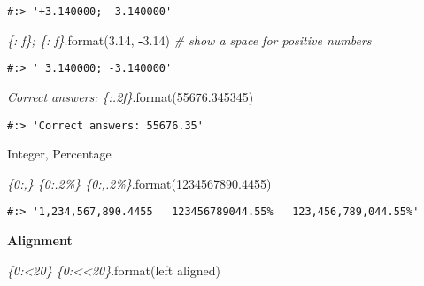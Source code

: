 \documentclass[
]{book}
\newenvironment{Shaded}{\begin{snugshade}}{\end{snugshade}}
\newcommand{\BuiltInTok}[1]{#1}
\newcommand{\CommentTok}[1]{\textcolor[rgb]{0.37,0.37,0.37}{\textit{#1}}}
\newcommand{\FloatTok}[1]{\textcolor[rgb]{0.06,0.06,0.06}{#1}}
\newcommand{\NormalTok}[1]{#1}
\newcommand{\OperatorTok}[1]{\textcolor[rgb]{0.43,0.43,0.43}{\textbf{#1}}}
\newcommand{\StringTok}[1]{\textcolor[rgb]{0.5,0.5,0.5}{#1}}
\begin{document}
\begin{verbatim}
#:> '+3.140000; -3.140000'
\end{verbatim}

\begin{Shaded}
\begin{Highlighting}[]
\CommentTok{\textquotesingle{}\{: f\}; \{: f\}\textquotesingle{}}\NormalTok{.}\BuiltInTok{format}\NormalTok{(}\FloatTok{3.14}\NormalTok{, }\OperatorTok{{-}}\FloatTok{3.14}\NormalTok{)  }\CommentTok{\# show a space for positive numbers}
\end{Highlighting}
\end{Shaded}

\begin{verbatim}
#:> ' 3.140000; -3.140000'
\end{verbatim}

\begin{Shaded}
\begin{Highlighting}[]
\CommentTok{\textquotesingle{}Correct answers: \{:.2f\}\textquotesingle{}}\NormalTok{.}\BuiltInTok{format}\NormalTok{(}\FloatTok{55676.345345}\NormalTok{)}
\end{Highlighting}
\end{Shaded}

\begin{verbatim}
#:> 'Correct answers: 55676.35'
\end{verbatim}

Integer, Percentage

\begin{Shaded}
\begin{Highlighting}[]
\CommentTok{\textquotesingle{}\{0:,\}   \{0:.2\%\}   \{0:,.2\%\}\textquotesingle{}}\NormalTok{.}\BuiltInTok{format}\NormalTok{(}\FloatTok{1234567890.4455}\NormalTok{)}
\end{Highlighting}
\end{Shaded}

\begin{verbatim}
#:> '1,234,567,890.4455   123456789044.55%   123,456,789,044.55%'
\end{verbatim}

\textbf{Alignment}

\begin{Shaded}
\begin{Highlighting}[]
\CommentTok{\textquotesingle{}\{0:\textless{}20\}   \{0:\textless{}\textless{}20\}\textquotesingle{}}\NormalTok{.}\BuiltInTok{format}\NormalTok{(}\StringTok{\textquotesingle{}left aligned\textquotesingle{}}\NormalTok{)}
\end{Highlighting}
\end{Shaded}
\end{document}
